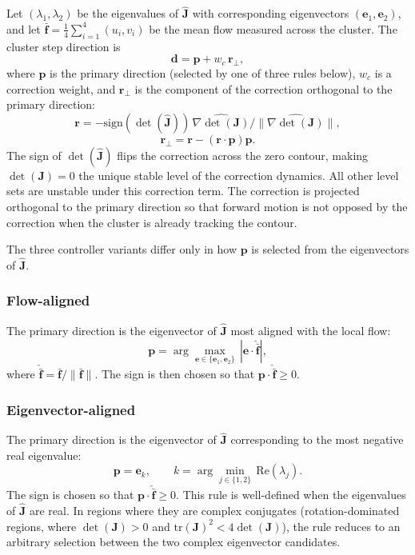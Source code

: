 \documentclass[lettersize,journal]{IEEEtran}
\begin{document}
Let $(\lambda_1, \lambda_2)$ be the eigenvalues of $\hat{\mathbf{J}}$ with corresponding eigenvectors $(\mathbf{e}_1, \mathbf{e}_2)$, and let $\bar{\mathbf{f}} = \frac{1}{4}\sum_{i=1}^{4}(u_i, v_i)$ be the mean flow measured across the cluster. The cluster step direction is
\begin{equation}
\mathbf{d} = \mathbf{p} + w_c\, \mathbf{r}_\perp,
\end{equation}
where $\mathbf{p}$ is the primary direction (selected by one of three rules below), $w_c$ is a correction weight, and $\mathbf{r}_\perp$ is the component of the correction orthogonal to the primary direction:
\begin{equation}
\mathbf{r} = -\mathrm{sign}(\det(\hat{\mathbf{J}}))\, \widehat{\nabla\det(\mathbf{J})} / \|\widehat{\nabla\det(\mathbf{J})}\|,
\end{equation}
\begin{equation}
\mathbf{r}_\perp = \mathbf{r} - (\mathbf{r} \cdot \mathbf{p})\mathbf{p}.
\end{equation}
The sign of $\det(\hat{\mathbf{J}})$ flips the correction across the zero contour, making $\det(\mathbf{J}) = 0$ the unique stable level of the correction dynamics. All other level sets are unstable under this correction term. The correction is projected orthogonal to the primary direction so that forward motion is not opposed by the correction when the cluster is already tracking the contour.

The three controller variants differ only in how $\mathbf{p}$ is selected from the eigenvectors of $\hat{\mathbf{J}}$.

\subsubsection{Flow-aligned}
The primary direction is the eigenvector of $\hat{\mathbf{J}}$ most aligned with the local flow:
\begin{equation}
\mathbf{p} = \arg\max_{\mathbf{e} \in \{\mathbf{e}_1, \mathbf{e}_2\}}\, \left| \mathbf{e} \cdot \hat{\bar{\mathbf{f}}} \right|,
\end{equation}
where $\hat{\bar{\mathbf{f}}} = \bar{\mathbf{f}} / \|\bar{\mathbf{f}}\|$. The sign is then chosen so that $\mathbf{p} \cdot \hat{\bar{\mathbf{f}}} \geq 0$.

\subsubsection{Eigenvector-aligned}
The primary direction is the eigenvector of $\hat{\mathbf{J}}$ corresponding to the most negative real eigenvalue:
\begin{equation}
\mathbf{p} = \mathbf{e}_k, \qquad k = \arg\min_{j \in \{1,2\}}\, \mathrm{Re}(\lambda_j).
\end{equation}
The sign is chosen so that $\mathbf{p} \cdot \hat{\bar{\mathbf{f}}} \geq 0$. This rule is well-defined when the eigenvalues of $\hat{\mathbf{J}}$ are real. In regions where they are complex conjugates (rotation-dominated regions, where $\det(\mathbf{J}) > 0$ and $\mathrm{tr}(\mathbf{J})^2 < 4\det(\mathbf{J})$), the rule reduces to an arbitrary selection between the two complex eigenvector candidates.
\end{document}
